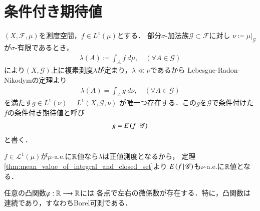 \section{条件付き期待値}
	\begin{screen}
		\begin{dfn}[条件付き期待値]
			$(X,\mathscr{F},\mu)$を測度空間，$f \in L^1(\mu)$とする．
			部分$\sigma$-加法族$\mathscr{G} \subset \mathscr{F}$に対し
			$\nu \coloneqq \left. \mu \right|_{\mathscr{G}}$が$\sigma$-有限であるとき，
			\begin{align}
				\lambda(A) \coloneqq \int_A f\ d\mu,
				\quad (\forall A \in \mathscr{G})
			\end{align}
			により$(X,\mathscr{G})$上に複素測度$\lambda$が定まり，$\lambda \ll \nu$であるから
			Lebesgue-Radon-Nikodymの定理より
			\begin{align}
				\lambda(A) = \int_A g\ d\nu,
				\quad (\forall A \in \mathscr{G})
			\end{align}
			を満たす$g \in L^1(\nu) = L^1\left(X,\mathscr{G},\nu\right)$
			が唯一つ存在する．この$g$を$\mathscr{G}$で条件付けた$f$の条件付き期待値と呼び
			\begin{align}
				g = E\left( f \, \middle|\, \mathscr{G} \right)
			\end{align}
			と書く．
		\end{dfn}
	\end{screen}
	
	$f \in \mathscr{L}^1(\mu)$が$\mu$-a.e.に$\mathbb{R}$値なら$\lambda$は正値測度となるから，
	定理\ref{thm:mean_value_of_integral_and_closed_set}より
	$E\left( f \, \middle|\, \mathscr{G} \right)$も$\nu$-a.e.に$\mathbb{R}$値となる．
	
	\begin{screen}
		\begin{lem}[凸関数の片側微係数の存在]
			任意の凸関数$\varphi:\mathbb{R} \longrightarrow \mathbb{R}$には
			各点で左右の微係数が存在する．特に，凸関数は連続であり，すなわちBorel可測である．
		\end{lem}
	\end{screen}
	
